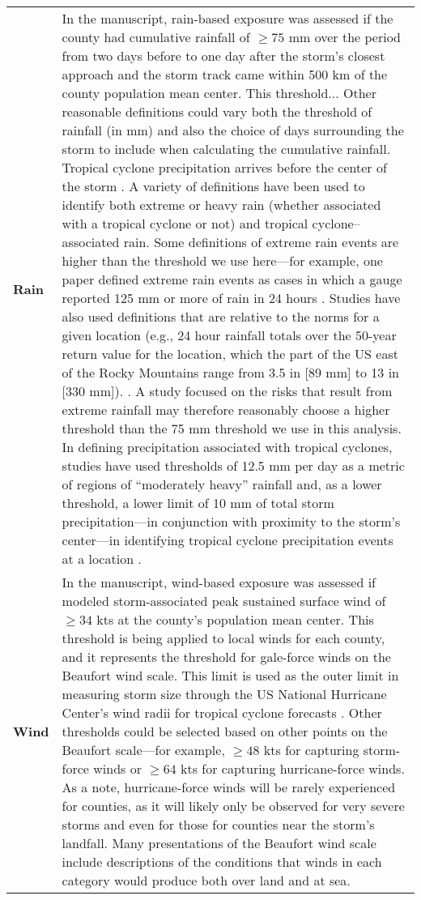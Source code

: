 \begin{table}
\begin{tabular}{>{\bfseries\leavevmode\color{black}}l>{\raggedright\arraybackslash}p{40em}}
Rain & In the manuscript, rain-based exposure was assessed if the county had cumulative rainfall of $\ge75$ mm over the period from two days before to one day after the storm’s closest approach and the storm track came within 500 km of the county population mean center. This threshold... Other reasonable definitions could vary both the threshold of rainfall (in mm) and also the choice of days surrounding the storm to include when calculating the cumulative rainfall. Tropical cyclone precipitation arrives before the center of the storm \cite{zhou2017spatial}. A variety of definitions have been used to identify both extreme or heavy rain (whether associated with a tropical cyclone or not) and tropical cyclone--associated rain. Some definitions of extreme rain events are higher than the threshold we use here---for example, one paper defined extreme rain events as cases in which a gauge reported 125 mm or more of rain in 24 hours \cite{schumacher2006characteristics}. Studies have also used definitions that are relative to the norms for a given location (e.g., 24 hour rainfall totals over the 50-year return value for the location, which the part of the US east of the Rocky Mountains range from 3.5 in [89 mm] to 13 in [330 mm]). \cite{schumacher2006characteristics, schumacher2005organization, stevenson201410}. A study focused on the risks that result from extreme rainfall may therefore reasonably choose a higher threshold than the 75 mm threshold we use in this analysis. In defining precipitation associated with tropical cyclones, studies have used thresholds of 12.5 mm per day as a metric of regions of ``moderately heavy'' rainfall \cite{zhou2017spatial} and, as a lower threshold, a lower limit of 10 mm of total storm precipitation---in conjunction with proximity to the storm's center---in identifying tropical cyclone precipitation events at a location \cite{feldmann2019estimation}. \\
Wind & In the manuscript, wind-based exposure was assessed if modeled storm-associated peak sustained surface wind of $\ge34$ kts at the county’s population mean center. This threshold is being applied to local winds for each county, and it represents the threshold for gale-force winds on the Beaufort wind scale. This limit is used as the outer limit in measuring storm size through the US National Hurricane Center's wind radii for tropical cyclone forecasts \cite{cangialosi2016examination}. Other thresholds could be selected based on other points on the Beaufort scale---for example, $\ge48$ kts for capturing storm-force winds or $\ge64$ kts for capturing hurricane-force winds. As a note, hurricane-force winds will be rarely experienced for counties, as it will likely only be observed for very severe storms and even for those for counties near the storm's landfall. Many presentations of the Beaufort wind scale include descriptions of the conditions that winds in each category would produce both over land and at sea.\\
\bottomrule
\end{tabular}
\end{table}